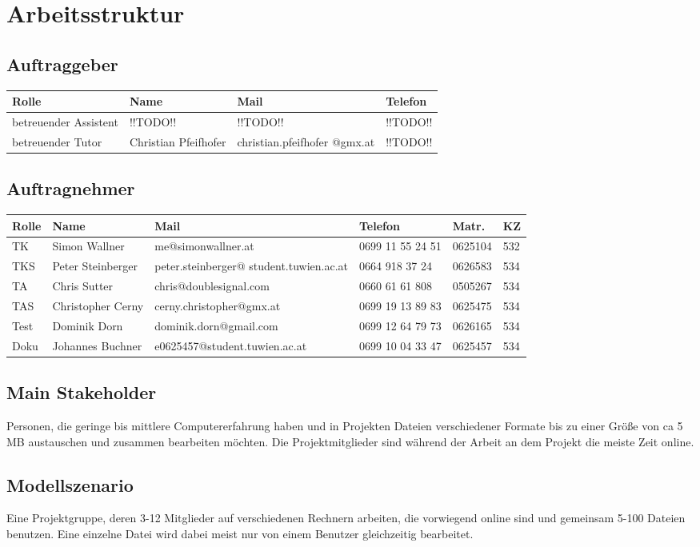 
\section{Arbeitsstruktur}
\subsection{Auftraggeber}
\begin{tabular}{ | l | l | p{3.5cm} | p{4cm} |}
\hline
\textbf{Rolle} & \textbf{Name} & \textbf{Mail} & \textbf{Telefon} \\
\hline
betreuender Assistent & !!TODO!! & !!TODO!! & !!TODO!! \\
\hline
betreuender Tutor & Christian Pfeifhofer  & christian.pfeifhofer @gmx.at & !!TODO!! \\
\hline
\end{tabular}

\subsection{Auftragnehmer}
\begin{tabular}{ | l | l | p{5.5cm} | p{1.7cm} | l | l |}
\hline
\textbf{Rolle} & \textbf{Name} & \textbf{Mail} & \textbf{Telefon} & \textbf{Matr.} & \textbf{KZ} \\
\hline
TK & Simon Wallner & me@simonwallner.at & 0699 11 55 24 51 & 0625104 & 532 \\
\hline
TKS & Peter Steinberger & peter.steinberger@ student.tuwien.ac.at & 0664 918 37 24 & 0626583 & 534 \\
\hline
TA & Chris Sutter & chris@doublesignal.com & 0660 61 61 808 & 0505267 & 534 \\
\hline
TAS & Christopher Cerny & cerny.christopher@gmx.at & 0699 19 13 89 83 & 0625475 & 534 \\
\hline
Test & Dominik Dorn & dominik.dorn@gmail.com & 0699 12 64 79 73 & 0626165 & 534 \\
\hline
Doku & Johannes Buchner & e0625457@student.tuwien.ac.at & 0699 10 04 33 47 & 0625457 & 534 \\
\hline
\end{tabular}

\subsection{Main Stakeholder}
Personen, die geringe bis mittlere Computererfahrung haben und in Projekten Dateien verschiedener Formate bis zu einer Größe von ca 5 MB austauschen und zusammen bearbeiten möchten. Die Projektmitglieder sind während der Arbeit an dem Projekt die meiste Zeit online.
\subsection{Modellszenario}

Eine Projektgruppe, deren 3-12 Mitglieder auf verschiedenen Rechnern arbeiten, die vorwiegend online sind und gemeinsam 5-100 Dateien benutzen. Eine einzelne Datei wird dabei meist nur von einem Benutzer gleichzeitig bearbeitet.

